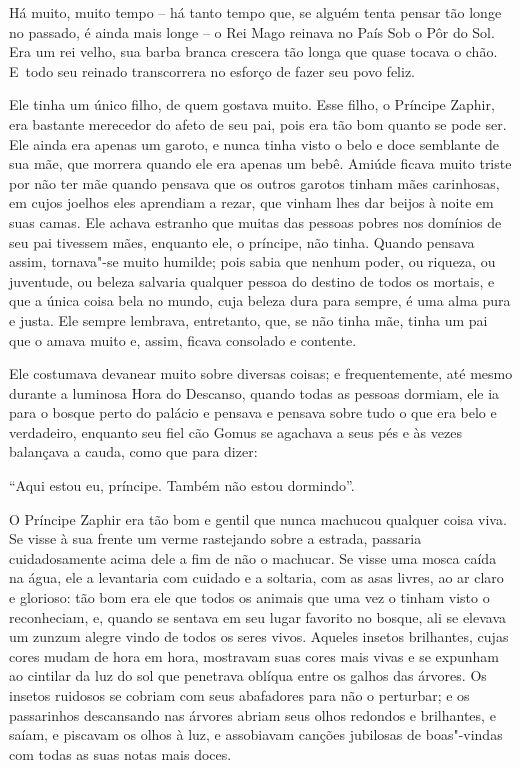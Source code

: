  

Há muito, muito tempo -- há tanto tempo que, se alguém tenta pensar tão
longe no passado, é ainda mais longe -- o Rei Mago reinava no País Sob
o Pôr do Sol. Era um rei velho, sua barba branca crescera tão longa que
quase tocava o chão. E~todo seu reinado transcorrera no esforço de fazer
seu povo feliz.

Ele tinha um único filho, de quem gostava muito. Esse filho, o Príncipe
Zaphir, era bastante merecedor do afeto de seu pai, pois era tão bom
quanto se pode ser. Ele ainda era apenas um garoto, e nunca tinha visto
o belo e doce semblante de sua mãe, que morrera quando ele era apenas um
bebê. Amiúde ficava muito triste por não ter mãe quando pensava que os
outros garotos tinham mães carinhosas, em cujos joelhos eles aprendiam a
rezar, que vinham lhes dar beijos à noite em suas camas. Ele achava
estranho que muitas das pessoas pobres nos domínios de seu pai tivessem
mães, enquanto ele, o príncipe, não tinha. Quando pensava assim,
tornava"-se muito humilde; pois sabia que nenhum poder, ou riqueza, ou
juventude, ou beleza salvaria qualquer pessoa do destino de todos os
mortais, e que a única coisa bela no mundo, cuja beleza dura para
sempre, é uma alma pura e justa. Ele sempre lembrava, entretanto, que,
se não tinha mãe, tinha um pai que o amava muito e, assim, ficava
consolado e contente.



Ele costumava devanear muito sobre diversas coisas; e frequentemente,
até mesmo durante a luminosa Hora do Descanso, quando todas as pessoas
dormiam, ele ia para o bosque perto do palácio e pensava e pensava sobre
tudo o que era belo e verdadeiro, enquanto seu fiel cão Gomus se
agachava a seus pés e às vezes balançava a cauda, como que para dizer:

``Aqui estou eu, príncipe. Também não estou dormindo''.

O Príncipe Zaphir era tão bom e gentil que nunca machucou qualquer coisa
viva. Se visse à sua frente um verme rastejando sobre a estrada, passaria
cuidadosamente acima dele a fim de não o machucar. Se visse uma mosca
caída na água, ele a levantaria com cuidado e a soltaria, com as asas
livres, ao ar claro e glorioso: tão bom era ele que todos os animais que
uma vez o tinham visto o reconheciam, e, quando se sentava em seu lugar
favorito no bosque, ali se elevava um zunzum alegre vindo de todos os
seres vivos. Aqueles insetos brilhantes, cujas cores mudam de hora em
hora, mostravam suas cores mais vivas e se expunham ao cintilar da luz
do sol que penetrava oblíqua entre os galhos das árvores. Os insetos
ruidosos se cobriam com seus abafadores para não o perturbar; e os
passarinhos descansando nas árvores abriam seus olhos redondos e
brilhantes, e saíam, e piscavam os olhos à luz, e assobiavam canções
jubilosas de boas"-vindas com todas as suas notas mais doces.

